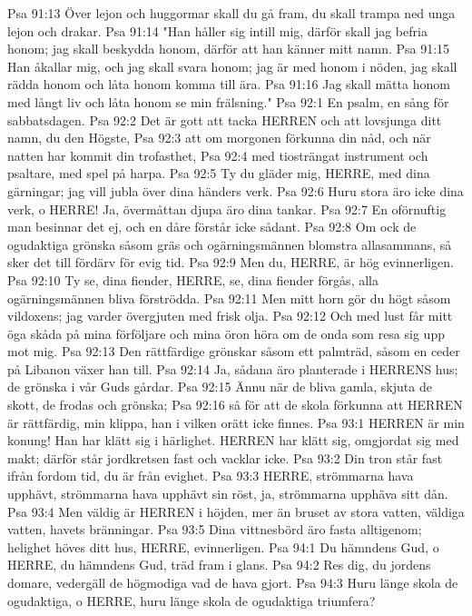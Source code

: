 Psa 91:13  Över lejon och huggormar skall du gå fram, du skall trampa ned unga lejon och drakar.
Psa 91:14  "Han håller sig intill mig, därför skall jag befria honom; jag skall beskydda honom, därför att han känner mitt namn.
Psa 91:15  Han åkallar mig, och jag skall svara honom; jag är med honom i nöden, jag skall rädda honom och låta honom komma till ära.
Psa 91:16  Jag skall mätta honom med långt liv och låta honom se min frälsning."
Psa 92:1  En psalm, en sång för sabbatsdagen.
Psa 92:2  Det är gott att tacka HERREN och att lovsjunga ditt namn, du den Högste,
Psa 92:3  att om morgonen förkunna din nåd, och när natten har kommit din trofasthet,
Psa 92:4  med tiosträngat instrument och psaltare, med spel på harpa.
Psa 92:5  Ty du gläder mig, HERRE, med dina gärningar; jag vill jubla över dina händers verk.
Psa 92:6  Huru stora äro icke dina verk, o HERRE! Ja, övermåttan djupa äro dina tankar.
Psa 92:7  En oförnuftig man besinnar det ej, och en dåre förstår icke sådant.
Psa 92:8  Om ock de ogudaktiga grönska såsom gräs och ogärningsmännen blomstra allasammans, så sker det till fördärv för evig tid.
Psa 92:9  Men du, HERRE, är hög evinnerligen.
Psa 92:10  Ty se, dina fiender, HERRE, se, dina fiender förgås, alla ogärningsmännen bliva förströdda.
Psa 92:11  Men mitt horn gör du högt såsom vildoxens; jag varder övergjuten med frisk olja.
Psa 92:12  Och med lust får mitt öga skåda på mina förföljare och mina öron höra om de onda som resa sig upp mot mig.
Psa 92:13  Den rättfärdige grönskar såsom ett palmträd, såsom en ceder på Libanon växer han till.
Psa 92:14  Ja, sådana äro planterade i HERRENS hus; de grönska i vår Guds gårdar.
Psa 92:15  Ännu när de bliva gamla, skjuta de skott, de frodas och grönska;
Psa 92:16  så för att de skola förkunna att HERREN är rättfärdig, min klippa, han i vilken orätt icke finnes.
Psa 93:1  HERREN är min konung! Han har klätt sig i härlighet. HERREN har klätt sig, omgjordat sig med makt; därför står jordkretsen fast och vacklar icke.
Psa 93:2  Din tron står fast ifrån fordom tid, du är från evighet.
Psa 93:3  HERRE, strömmarna hava upphävt, strömmarna hava upphävt sin röst, ja, strömmarna upphäva sitt dån.
Psa 93:4  Men väldig är HERREN i höjden, mer än bruset av stora vatten, väldiga vatten, havets bränningar.
Psa 93:5  Dina vittnesbörd äro fasta alltigenom; helighet höves ditt hus, HERRE, evinnerligen.
Psa 94:1  Du hämndens Gud, o HERRE, du hämndens Gud, träd fram i glans.
Psa 94:2  Res dig, du jordens domare, vedergäll de högmodiga vad de hava gjort.
Psa 94:3  Huru länge skola de ogudaktiga, o HERRE, huru länge skola de ogudaktiga triumfera?
